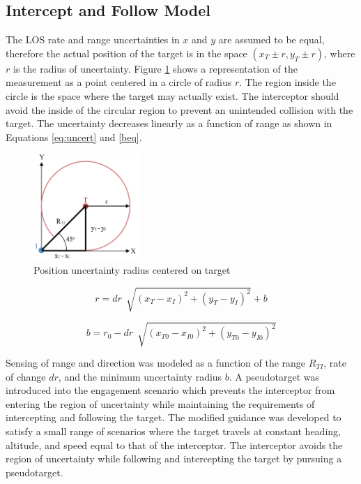 \documentclass[conference]{IEEEtran}
\begin{document}
\subsection{Intercept and Follow Model}
The LOS rate and range uncertainties in $x$ and $y$ are assumed to be equal, therefore the actual position of the target is in the space $(x_T\pm r,y_T \pm r)$, where $r$ is the radius of uncertainty. Figure \ref{fig:uncertrad} shows a representation of the measurement as a point centered in a circle of radius $r$. The region inside the circle is the space where the target may actually exist. The interceptor should avoid the inside of the circular region to prevent an unintended collision with the target. The uncertainty decreases linearly as a function of range as shown in Equations \ref{eq:uncert} and \ref{beq}.

\begin{figure}[H]
	\centering
	\includegraphics[width=4cm]{45deguncert.PNG}
	\caption{Position uncertainty radius centered on target}
	\label{fig:uncertrad}
\end{figure}




\begin{equation} \label{eq:uncert}
r = dr \,\sqrt[]{(x_T - x_I)^2+(y_T - y_I)^2}+b
\end{equation}




\begin{equation} \label{beq}
b = r_0-dr \,\sqrt[]{(x_{T0} - x_{I0})^2+(y_{T0} - y_{I0})^2}
\end{equation}

Sensing of range and direction was modeled as a function of the range $R_{TI}$, rate of change $dr$, and the minimum uncertainty radius $b$. A pseudotarget was introduced into the engagement scenario which prevents the interceptor from entering the region of uncertainty while maintaining the requirements of intercepting and following the target. The modified guidance was developed to satisfy a small range of scenarios where the target travels at constant heading, altitude, and speed equal to that of the interceptor. The interceptor avoids the region of uncertainty while following and intercepting the target by pursuing a pseudotarget. 
\end{document}
